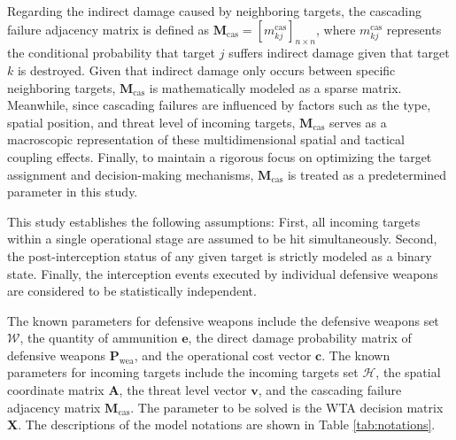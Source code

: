 \documentclass[lettersize,journal]{IEEEtran}
\begin{document}
Regarding the indirect damage caused by neighboring targets, the cascading failure adjacency matrix is defined as $\mathbf{M}_{\text{cas}} = [m_{kj}^{\text{cas}}]_{n \times n}$, where $m_{kj}^{\text{cas}}$ represents the conditional probability that target $j$ suffers indirect damage given that target $k$ is destroyed. Given that indirect damage only occurs between specific neighboring targets, $\mathbf{M}_{\text{cas}}$ is mathematically modeled as a sparse matrix. Meanwhile, since cascading failures are influenced by factors such as the type, spatial position, and threat level of incoming targets, $\mathbf{M}_{\text{cas}}$ serves as a macroscopic representation of these multidimensional spatial and tactical coupling effects. Finally, to maintain a rigorous focus on optimizing the target assignment and decision-making mechanisms, $\mathbf{M}_{\text{cas}}$ is treated as a predetermined parameter in this study.

This study establishes the following assumptions: First, all incoming targets within a single operational stage are assumed to be hit simultaneously. Second, the post-interception status of any given target is strictly modeled as a binary state. Finally, the interception events executed by individual defensive weapons are considered to be statistically independent.

The known parameters for defensive weapons include the defensive weapons set $\mathcal{W}$, the quantity of ammunition $\boldsymbol{e}$, the direct damage probability matrix of defensive weapons $\mathbf{P}_{\text{wea}}$, and the operational cost vector $\boldsymbol{c}$. The known parameters for incoming targets include the incoming targets set $\mathcal{H}$, the spatial coordinate matrix $\mathbf{A}$, the threat level vector $\boldsymbol{v}$, and the cascading failure adjacency matrix $\mathbf{M}_{\text{cas}}$. The parameter to be solved is the WTA decision matrix $\mathbf{X}$. The descriptions of the model notations are shown in Table \ref{tab:notations}.
    
\end{document}
